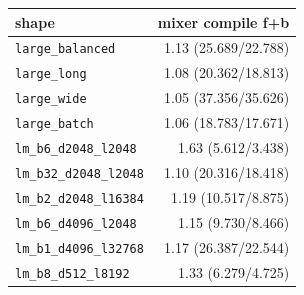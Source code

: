 \begin{tabular}{l r }
\toprule
shape & mixer compile f+b \\
\midrule
\texttt{large\_balanced} & 1.13 (25.689/22.788) \\
\texttt{large\_long} & 1.08 (20.362/18.813) \\
\texttt{large\_wide} & 1.05 (37.356/35.626) \\
\texttt{large\_batch} & 1.06 (18.783/17.671) \\
\texttt{lm\_b6\_d2048\_l2048} & 1.63 (5.612/3.438) \\
\texttt{lm\_b32\_d2048\_l2048} & 1.10 (20.316/18.418) \\
\texttt{lm\_b2\_d2048\_l16384} & 1.19 (10.517/8.875) \\
\texttt{lm\_b6\_d4096\_l2048} & 1.15 (9.730/8.466) \\
\texttt{lm\_b1\_d4096\_l32768} & 1.17 (26.387/22.544) \\
\texttt{lm\_b8\_d512\_l8192} & 1.33 (6.279/4.725) \\
\bottomrule
\end{tabular}
